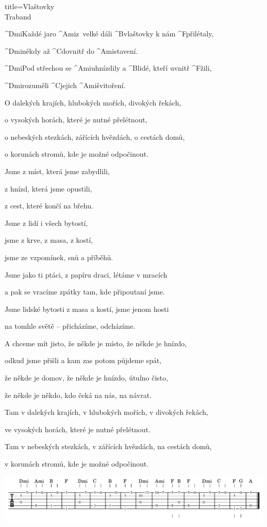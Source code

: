 \begin{song}{title=\predtitle\centering Vlaštovky \\\large Traband  \vspace*{-0.3cm}}  %
\begin{centerjustified}

\sloka 
	^{Dmi\z}Každé jaro ^{Ami\z}z~velké dáli ^{B\z }vlaštovky k nám ^{F\z }přilétaly,

	^{Dmi\z }někdy až ^{C\z }dovnitř do ^{\z Ami}stavení.

	^{Dmi}Pod střechou se ^{Ami\z }uhnízdily a ^{B\z }lidé, kteří uvnitř ^{F\z }žili,
	
	^{Dmi\z }rozuměli ^{C\z }jejich ^{\z Ami}švitoření.


\sloka 
	O dalekých krajích, hlubokých mořích, divokých řekách,

	o vysokých horách, které je nutné přelétnout,

	o nebeských stezkách, zářících hvězdách, o cestách domů,

	o korunách stromů, kde je možné odpočinout.


\sloka 
	Jsme z míst, která jsme zabydlili,

	z hnízd, která jsme opustili,

	z cest, které končí na břehu.

	Jsme z lidí i všech bytostí,

	jsme z krve, z masa, z kostí,

	jsme ze vzpomínek, snů a příběhů.


\sloka 
	Jsme jako ti ptáci, z papíru draci, létáme v mracích

	a pak se vracíme zpátky tam, kde připoutaní jsme.

	Jsme lidské bytosti z masa a kostí, jsme jenom hosti

	na tomhle světě -- přicházíme, odcházíme.


\sloka 
	A chceme mít jisto, že někde je místo, že někde je hnízdo,

	odkud jsme přišli a kam zas potom půjdeme spát,

	že někde je domov, že někde je hnízdo, útulno čisto,

	že někde je někdo, kdo čeká na nás, na návrat.


\sloka 
	Tam v dalekých krajích, v hlubokých mořích, v divokých řekách,

	ve vysokých horách, které je nutné přelétnout.

	Tam v nebeských stezkách, v zářících hvězdách, na cestách domů,

	v korunách stromů, kde je možné odpočinout.

\end{centerjustified}

\centering
\includegraphics[scale=\defaulttabscale]{../taby/vlastovky.pdf}

\setcounter{Slokočet}{0}
\end{song}
